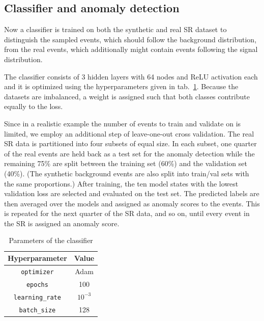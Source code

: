 \documentclass[prd, twocolumn, superscriptaddress,floatfix, nofootinbib, preprintnumbers]{revtex4-2}
\begin{document}
\subsection{Classifier and anomaly detection}

Now a classifier is trained on both the synthetic and real SR dataset to distinguish the sampled events, which should follow the background distribution, from the real events, which additionally might contain events following the signal distribution.

The classifier consists of 3 hidden layers with 64 nodes and ReLU activation each and it is optimized using the hyperparameters given in tab.~\ref{tab:Classifier}. Because the datasets are imbalanced, a weight is assigned such that both classes contribute equally to the loss.


Since in a realistic example the number of events to train and validate on is limited, we employ an additional step of leave-one-out cross validation. The real SR data is partitioned into four subsets of equal size. In each subset, one quarter of the real events are held back as a test set for the anomaly detection while the remaining 75\% are split between the training set (60\%) and the validation set (40\%). (The synthetic background events are also split into train/val sets with the same proportions.) After training, the ten model states with the lowest validation loss are selected and evaluated on the test set. The predicted labels are then averaged over the models and assigned as anomaly scores to the events. This is repeated for the next quarter of the SR data, and so on, until every event in the SR is assigned an anomaly score. 




\begin{table}[t]
\begin{center}
\begin{tabular}{| c c |}
\hline
Hyperparameter & Value \\
\hline
\verb|optimizer| & Adam\\
\verb|epochs| & 100\\
\verb|learning_rate| & $10^{-3}$\\
\verb|batch_size| & 128\\
\hline
\end{tabular}
\caption{Parameters of the classifier}
\label{tab:Classifier}
\end{center}
\end{table}
\end{document}

